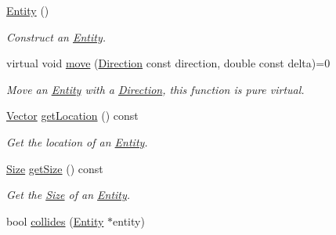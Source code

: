 \begin{DoxyCompactItemize}
\item 
\hypertarget{classty_lib_1_1_entity_a193805649ec834e473afd601832a857c}{}\hyperlink{classty_lib_1_1_entity_a193805649ec834e473afd601832a857c}{Entity} ()\label{classty_lib_1_1_entity_a193805649ec834e473afd601832a857c}

\begin{DoxyCompactList}\small\item\em Construct an \hyperlink{classty_lib_1_1_entity}{Entity}. \end{DoxyCompactList}\item 
\hypertarget{classty_lib_1_1_entity_a091f0b74ac6e7645d39b6b8d37873cf1}{}virtual void \hyperlink{classty_lib_1_1_entity_a091f0b74ac6e7645d39b6b8d37873cf1}{move} (\hyperlink{classty_lib_1_1_direction}{Direction} const direction, double const delta)=0\label{classty_lib_1_1_entity_a091f0b74ac6e7645d39b6b8d37873cf1}

\begin{DoxyCompactList}\small\item\em Move an \hyperlink{classty_lib_1_1_entity}{Entity} with a \hyperlink{classty_lib_1_1_direction}{Direction}, this function is pure virtual. \end{DoxyCompactList}\item 
\hypertarget{classty_lib_1_1_entity_aee571c378800bd3e2aebaa8065617be0}{}\hyperlink{classty_lib_1_1_vector}{Vector} \hyperlink{classty_lib_1_1_entity_aee571c378800bd3e2aebaa8065617be0}{get\+Location} () const \label{classty_lib_1_1_entity_aee571c378800bd3e2aebaa8065617be0}

\begin{DoxyCompactList}\small\item\em Get the location of an \hyperlink{classty_lib_1_1_entity}{Entity}. \end{DoxyCompactList}\item 
\hypertarget{classty_lib_1_1_entity_a6e5c374923ed5c6474a6520c5ed8081b}{}\hyperlink{classty_lib_1_1_size}{Size} \hyperlink{classty_lib_1_1_entity_a6e5c374923ed5c6474a6520c5ed8081b}{get\+Size} () const \label{classty_lib_1_1_entity_a6e5c374923ed5c6474a6520c5ed8081b}

\begin{DoxyCompactList}\small\item\em Get the \hyperlink{classty_lib_1_1_size}{Size} of an \hyperlink{classty_lib_1_1_entity}{Entity}. \end{DoxyCompactList}\item 
\hypertarget{classty_lib_1_1_entity_a5a343573cf472453795a1818b3512e03}{}bool \hyperlink{classty_lib_1_1_entity_a5a343573cf472453795a1818b3512e03}{collides} (\hyperlink{classty_lib_1_1_entity}{Entity} $\ast$entity)\label{classty_lib_1_1_entity_a5a343573cf472453795a1818b3512e03}


\end{DoxyCompactItemize}
